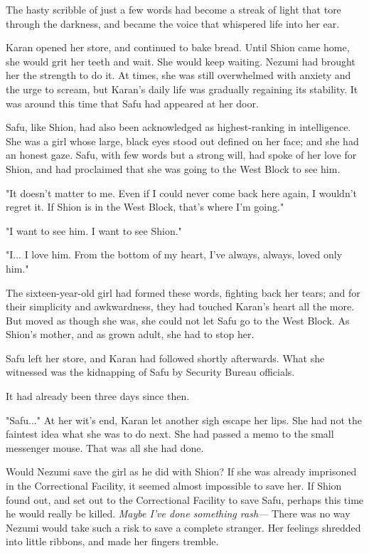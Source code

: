 The hasty scribble of just a few words had become a streak of light that
tore through the darkness, and became the voice that whispered life into
her ear.

Karan opened her store, and continued to bake bread. Until Shion came
home, she would grit her teeth and wait. She would keep waiting. Nezumi
had brought her the strength to do it. At times, she was still
overwhelmed with anxiety and the urge to scream, but Karan's daily life
was gradually regaining its stability. It was around this time that Safu
had appeared at her door.

Safu, like Shion, had also been acknowledged as highest-ranking in
intelligence. She was a girl whose large, black eyes stood out defined
on her face; and she had an honest gaze. Safu, with few words but a
strong will, had spoke of her love for Shion, and had proclaimed that
she was going to the West Block to see him.

"It doesn't matter to me. Even if I could never come back here again, I
wouldn't regret it. If Shion is in the West Block, that's where I'm
going."

"I want to see him. I want to see Shion."

"I... I love him. From the bottom of my heart, I've always, always,
loved only him."

The sixteen-year-old girl had formed these words, fighting back her
tears; and for their simplicity and awkwardness, they had touched
Karan's heart all the more. But moved as though she was, she could not
let Safu go to the West Block. As Shion's mother, and as grown adult,
she had to stop her.

Safu left her store, and Karan had followed shortly afterwards. What she
witnessed was the kidnapping of Safu by Security Bureau officials.

It had already been three days since then.

"Safu..." At her wit's end, Karan let another sigh escape her lips. She
had not the faintest idea what she was to do next. She had passed a memo
to the small messenger mouse. That was all she had done.

Would Nezumi save the girl as he did with Shion? If she was already
imprisoned in the Correctional Facility, it seemed almost impossible to
save her. If Shion found out, and set out to the Correctional Facility
to save Safu, perhaps this time he would really be killed. \emph{Maybe I've
done something rash---} There was no way Nezumi would take such a risk to
save a complete stranger. Her feelings shredded into little ribbons, and
made her fingers tremble.

